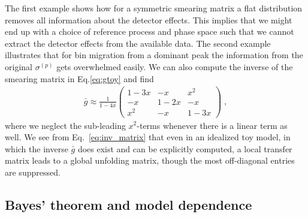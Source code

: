 %
The first example shows how for a symmetric smearing matrix a flat
distribution removes all information about the detector effects. This
implies that we might end up with a choice of reference
process and phase space such that we cannot extract the
detector effects from the available data. The second example
illustrates that for bin migration from a dominant peak the
information from the original $\sigma^{(p)}$ gets overwhelmed
easily. We can also compute the inverse of the smearing matrix in
Eq.\eqref{eq:gtoy} and find
%
\begin{align}\label{eq:inv_matrix}
  \bar{g}
  \approx \frac{1}{1-4x}
  \begin{pmatrix}
  1-3x & -x & x^2 \\ -x & 1-2x & -x \\ x^2 & -x & 1-3x
  \end{pmatrix} \; ,
\end{align}
%
where we neglect the sub-leading $x^2$-terms whenever there is a
linear term as well. 
We see from Eq.~\ref{eq:inv_matrix} that even in an idealized toy model, 
in which the inverse $\bar{g}$ does exist and can be explicitly computed,
a local transfer matrix leads to a global unfolding matrix,
though the most off-diagonal entries are suppressed.

\subsection{Bayes' theorem and model dependence}
\label{sec:basics_model}


